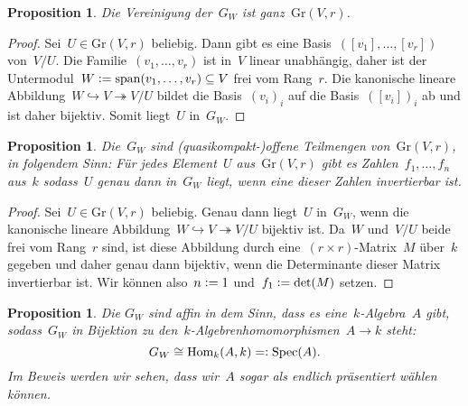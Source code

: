 \documentclass[a4paper,ngerman,12pt]{scrartcl}
\theoremstyle{definition}
\theoremstyle{plain}
\newtheorem{prop}[defn]{Proposition}
\theoremstyle{remark}
\newcommand{\Hom}{\mathrm{Hom}}
\DeclareMathOperator{\Spec}{Spec}
\newcommand{\defeq}{\vcentcolon=}
\newcommand{\Gr}{\mathrm{Gr}}
\begin{document}
\begin{prop}Die Vereinigung der~$G_W$ ist ganz~$\Gr(V,r)$.\end{prop}

\begin{proof}Sei~$U \in \Gr(V,r)$ beliebig. Dann gibt es eine
Basis~$([v_1],\ldots,[v_r])$ von~$V/U$. Die Familie~$(v_1,\ldots,v_r)$ ist
in~$V$ linear unabhängig, daher ist der Untermodul~$W \defeq
\operatorname{span}(v_1,\ldots,v_r) \subseteq V$ frei vom Rang~$r$. Die
kanonische lineare Abbildung~$W \hookrightarrow V \twoheadrightarrow V/U$ bildet die
Basis~$(v_i)_i$ auf die Basis~$([v_i])_i$ ab und ist daher bijektiv. Somit
liegt~$U$ in~$G_W$.\end{proof}

\begin{prop}Die~$G_W$ sind (quasikompakt-)offene Teilmengen von~$\Gr(V,r)$, in
folgendem Sinn: Für jedes Element~$U$ aus~$\Gr(V,r)$ gibt es
Zahlen~$f_1,\ldots,f_n$ aus~$k$ sodass~$U$ genau dann in~$G_W$ liegt, wenn
eine dieser Zahlen invertierbar ist.
\end{prop}

\begin{proof}Sei~$U \in \Gr(V,r)$ beliebig. Genau dann liegt~$U$ in~$G_W$, wenn
die kanonische lineare Abbildung~$W \hookrightarrow V \twoheadrightarrow V/U$
bijektiv ist. Da~$W$ und~$V/U$ beide frei vom Rang~$r$ sind, ist diese
Abbildung durch eine~$(r \times r)$-Matrix~$M$ über~$k$ gegeben und daher genau
dann bijektiv, wenn die Determinante dieser Matrix invertierbar ist. Wir können
also~$n \defeq 1$ und~$f_1 \defeq \det(M)$ setzen.
\end{proof}

\begin{prop}Die $G_W$ sind affin in dem Sinn, dass es eine~$k$-Algebra~$A$ gibt,
sodass~$G_W$ in Bijektion zu den~$k$-Algebrenhomomorphismen~$A \to k$
steht:
\[ G_W \cong \Hom_k(A, k) =\vcentcolon \Spec(A). \]
Im Beweis werden wir sehen, dass wir~$A$ sogar als endlich präsentiert wählen
können.\end{prop}
\end{document}
